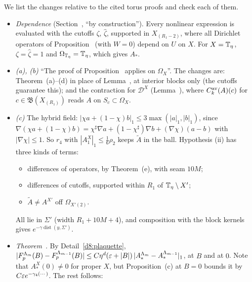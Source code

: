 \begin{detail}\label{d8:interaction}
We list the changes relative to the cited torus proofs and check each of them.
\begin{itemize}
\item \emph{Dependence} (Section~, ``by construction''). Every nonlinear expression is evaluated with the cutoffs $\zeta$, $\hat\zeta$, supported in $X_{(R_1-2)}$, where all Dirichlet operators of Proposition~ (with $W=0$) depend on $U$ on $\hat X$. For $X=\mathbb T_\eta$, $\zeta=\hat\zeta=1$ and $\Omega_{\mathbb T_\eta}=\mathbb T_\eta$, which gives $A_*$.
\item \emph{(a), (b)} ``The proof of Proposition~ applies on $\Omega_X$''. The changes are: Theorem~(a)--(d) in place of Lemma~, at interior blocks only (the cutoffs guarantee this); and the contraction for $\mathcal D^X$ (Lemma~), where $C^{\rm av}_k(A)(c)$ for $c\in\mathfrak B(X_{(R_1)})$ reads $A$ on $S_c\subset\Omega_X$.
\item \emph{(c)} The hybrid field: $|\chi a+(1-\chi)b|_1\le3\max(|a|_1,|b|_1)$, since $\nabla(\chi a+(1-\chi)b)=\chi^\sharp\nabla a+(1-\chi^\sharp)\nabla b+(\nabla\chi)(a-b)$ with $|\nabla\chi|\le1$. So $r_4$ with $|A_1^X|_1\le\frac16\rho_2$ keeps $\tilde A$ in the ball. Hypothesis (ii) has three kinds of terms:
  \begin{itemize}
  \item differences of operators, by Theorem~(e), with seam $10M$;
  \item differences of cutoffs, supported within $R_1$ of $\mathbb T_\eta\setminus X'$;
  \item $\tilde A\ne A^{X'}$ off $\Omega_{X'(2)}$.
  \end{itemize}
  All lie in $\Sigma'$ (width $R_1+10M+4$), and composition with the block kernels gives $e^{-\gamma\operatorname{dist}(y,\Sigma')}$.
\item \emph{Theorem~.} By Detail~\ref{d8:plaquette}, $|F^{\Lambda_m}_p(B)-F^{\Lambda_{m-1}}_p(B)|\le C\eta^d(\varepsilon+|B|)\,|A^{\Lambda_m}_*-A^{\Lambda_{m-1}}_*|_1$, at $B$ and at $0$. Note that $A^X_*(0)\ne0$ for proper $X$, but Proposition~(c) at $B=0$ bounds it by $C\varepsilon e^{-\gamma_4(\cdots)}$. The rest follows:

\end{itemize}
\end{detail}
